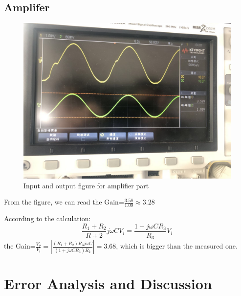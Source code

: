 \documentclass[12pt]{article}
\begin{document}
\subsection{Amplifer}
\begin{figure}[H]
\centering
\includegraphics[scale=0.2]{P20.jpg}
\caption{Input and output figure for amplifier part}
\end{figure}
From the figure, we can read the Gain=$\frac{3.58}{1.09}\approx3.28$
\par According to the calculation:
$$\frac{R_1+R_2}{R+2}j\omega CV_i=\frac{1+j\omega CR_3}{R_3}V_i$$
the Gain=$\frac{V_o}{V_i}=|\frac{(R_1+R_2)R_3j\omega C}{(1+j\omega CR_3)R_2}|=3.68$, which is bigger than the measured one.
\section{Error Analysis and Discussion}
\end{document}
